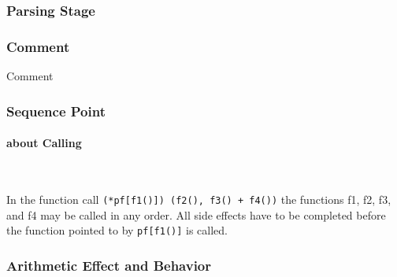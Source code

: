 

\subsubsection{Parsing Stage}


\subsubsection{Comment}
{Comment}

\subsubsection{Sequence Point}

\paragraph{about Calling} \

In the function call \verb`(*pf[f1()]) (f2(), f3() + f4())` the functions f1, f2, f3, and f4 may be called in any order. All side effects have to be completed before the function pointed to by \verb`pf[f1()]` is called.

\subsubsection{Arithmetic Effect and Behavior}

